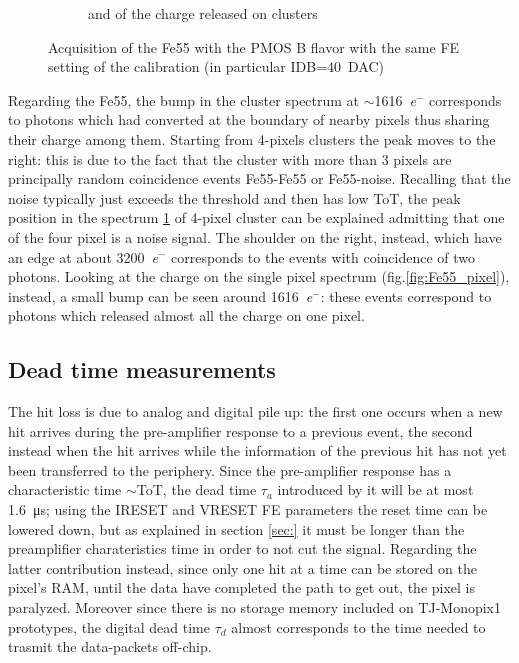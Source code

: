\begin{figure}
\begin{subfigure}[b]{0.49\textwidth}
                \caption{and of the charge released on clusters}
                \label{fig:Fe55_cluster}
            \end{subfigure}
            \caption{Acquisition of the Fe55 with the PMOS B flavor with the same FE setting of the calibration (in particular IDB=\SI{40}{DAC})}
            \label{fig:spectrum_Fe55}
        \end{figure}   
        Regarding the Fe55, the bump in the cluster spectrum at $\sim$\SI{1616}{\elementarycharge}$^-$ corresponds to photons which had converted at the boundary of nearby pixels thus sharing their charge among them. Starting from 4-pixels clusters the peak moves to the right: this is due to the fact that the cluster with more than 3 pixels are principally random coincidence events Fe55-Fe55 or Fe55-noise. Recalling that the noise typically just exceeds the threshold and then has low ToT, the peak position in the spectrum \ref{fig:Fe55_cluster} of 4-pixel cluster can be explained admitting that one of the four pixel is a noise signal. 
        The shoulder on the right, instead, which have an edge at about \SI{3200}{\elementarycharge}$^-$ corresponds to the events with coincidence of two photons.
        Looking at the charge on the single pixel spectrum (fig.\ref{fig:Fe55_pixel}), instead, a small bump can be seen around \SI{1616}{\elementarycharge}$^-$: these events correspond to photons which released almost all the charge on one pixel. 

    \subsection{Dead time measurements}
        The hit loss is due to analog and digital pile up: the first one occurs when a new hit arrives during the pre-amplifier response to a previous event, the second instead when the hit arrives while the information of the previous hit has not yet been transferred to the periphery.  
        Since the pre-amplifier response has a characteristic time $\sim$ToT, the dead time $\tau_{a}$ introduced by it will be at most \SI{1.6}{\us}; using the IRESET and VRESET FE parameters the reset time can be lowered down, but as explained in section \ref{sec:} it must be longer than the preamplifier charateristics time in order to not cut the signal. 
        Regarding the latter contribution instead, since only one hit at a time can be stored on the pixel's RAM, until the data have completed the path to get out, the pixel is paralyzed. Moreover since there is no storage memory included on TJ-Monopix1 prototypes, the digital dead time $\tau_{d}$ almost corresponds to the time needed to trasmit the data-packets off-chip. 

